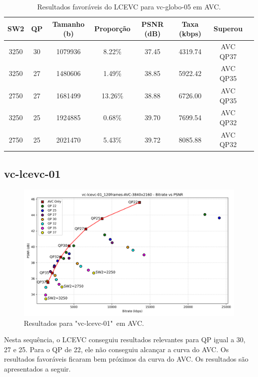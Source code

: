 \begin{table}[h]
    \centering
    \label{tab:vc-globo-05-avc-lcevc}
    \begin{tabular}{|c|c|c|c|c|c|c|c|}
        \hline
        \textbf{SW2} & \textbf{QP} & \textbf{Tamanho (b)} & \textbf{Proporção} & \textbf{PSNR (dB)} & \textbf{Taxa (kbps)} & \textbf{Superou} \\
        \hline
            3250 & 30 & 1079936 & 8.22\% & 37.45 & 4319.74 & AVC QP37 \\
            3250 & 27 & 1480606 & 1.49\% & 38.85 & 5922.42 & AVC QP35 \\
            2750 & 27 & 1681499 & 13.26\% & 38.88 & 6726.00 & AVC QP35 \\
            3250 & 25 & 1924885 & 0.68\% & 39.70 & 7699.54 & AVC QP32 \\
            2750 & 25 & 2021470 & 5.43\% & 39.72 & 8085.88 & AVC QP32 \\
        \hline
    \end{tabular}
    \caption{Resultados favoráveis do LCEVC para vc-globo-05 em AVC.}
\end{table}

\newpage
\subsection{vc-lcevc-01}

\begin{figure}[h]
    \centering
    \includegraphics[width=1.0\textwidth]{img/vc-lcevc-01_120frames-AVC.png}
    \caption{Resultados para "vc-lcevc-01"\ em \acrshort{AVC}.}
    \label{fig:vc-lcevc-01}
\end{figure}

Nesta sequência, o \acrshort{LCEVC} conseguiu resultados relevantes para QP igual
a 30, 27 e 25. Para o QP de 22, ele não conseguiu alcançar a curva do \acrshort{AVC}.
Os resultados favoráveis ficaram bem próximos da curva do \acrshort{AVC}. Os 
resultados são apresentados a seguir.

